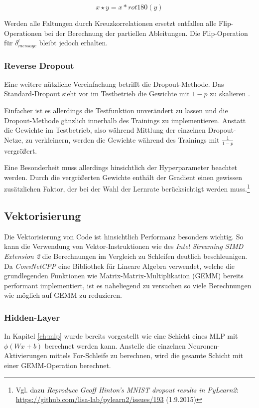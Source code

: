 \begin{equation}
\label{eq:correlation} 
x \star y = x \ast rot180(y)
\end{equation}

Werden alle Faltungen durch Kreuzkorrelationen ersetzt entfallen alle Flip-Operationen bei der Berechnung der partiellen Ableitungen. Die Flip-Oper\-ation für $\delta_{message}^l$ bleibt jedoch erhalten.

\subsubsection{Reverse Dropout}
Eine weitere nützliche Vereinfachung betrifft die Dropout-Methode. Das Standard-Dropout sieht vor im Testbetrieb die Gewichte mit $1-p$ zu skalieren \cite[vgl.][]{Srivastava2014}. 

Einfacher ist es allerdings die Testfunktion unverändert zu lassen und die Dropout-Methode gänzlich innerhalb des Trainings zu implementieren. Anstatt die Gewichte im Testbetrieb, also während Mittlung der einzelnen Dropout-Netze, zu verkleinern, werden die Gewichte während des Trainings mit $\frac{1}{1-p}$ vergrößert.

Eine Besonderheit muss allerdings hinsichtlich der Hyperparameter beachtet werden. Durch die vergrößerten Gewichte enthält der Gradient einen gewissen zusätzlichen Faktor, der bei der Wahl der Lernrate berücksichtigt werden muss.\footnote{Vgl. dazu \textit{Reproduce Geoff Hinton's MNIST dropout results in PyLearn2}: \url{https://github.com/lisa-lab/pylearn2/issues/193} (1.9.2015)}

\subsection{Vektorisierung}
Die Vektorisierung von Code ist hinsichtlich Performanz besonders wichtig. So kann die Verwendung von Vektor-Instruktionen wie des \textit{Intel Streaming SIMD Extension 2} die Berechnungen im Vergleich zu Schleifen deutlich beschleunigen. 
Da \textit{ConvNetCPP} eine Bibliothek für Lineare Algebra verwendet, welche die grundlegenden Funktionen wie Matrix-Matrix-Multiplikation (GEMM) bereits performant implementiert, ist es naheliegend zu versuchen so viele Berechnungen wie möglich auf GEMM zu reduzieren.

\subsubsection{Hidden-Layer}
In Kapitel \ref{ch:mlp} wurde bereits vorgestellt wie eine Schicht eines MLP mit $\phi(Wx + b)$ berechnet werden kann. Anstelle die einzelnen Neuronen-Aktivierungen mittels For-Schleife zu berechnen, wird die gesamte Schicht mit einer GEMM-Operation berechnet. 

